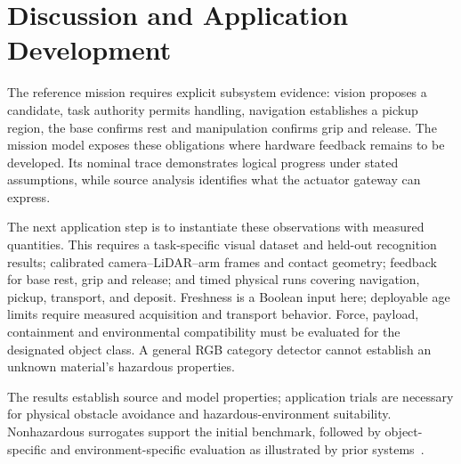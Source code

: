 \section{Discussion and Application Development}
The reference mission requires explicit subsystem evidence: vision proposes a candidate, task authority permits handling, navigation establishes a pickup region, the base confirms rest and manipulation confirms grip and release. The mission model exposes these obligations where hardware feedback remains to be developed. Its nominal trace demonstrates logical progress under stated assumptions, while source analysis identifies what the actuator gateway can express.

The next application step is to instantiate these observations with measured quantities. This requires a task-specific visual dataset and held-out recognition results; calibrated camera--LiDAR--arm frames and contact geometry; feedback for base rest, grip and release; and timed physical runs covering navigation, pickup, transport, and deposit. Freshness is a Boolean input here; deployable age limits require measured acquisition and transport behavior. Force, payload, containment and environmental compatibility must be evaluated for the designated object class. A general RGB category detector cannot establish an unknown material's hazardous properties.

The results establish source and model properties; application trials are necessary for physical obstacle avoidance and hazardous-environment suitability. Nonhazardous surrogates support the initial benchmark, followed by object-specific and environment-specific evaluation as illustrated by prior systems~\cite{bird2022vega,kemp2022stretch}.
